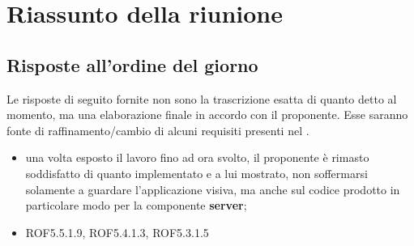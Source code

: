 %


\section{Riassunto della riunione} %
\label{sec:riassunto_della_riunione}

\subsection{Risposte all'ordine del giorno}
Le risposte di seguito fornite non sono la trascrizione esatta di quanto detto al momento, ma una elaborazione finale in accordo con il proponente. \newline
Esse saranno fonte di raffinamento/cambio di alcuni requisiti presenti nel \docNameVersionAdR.

\begin{itemize}
  	\item una volta esposto il lavoro fino ad ora svolto, il proponente è rimasto soddisfatto di quanto implementato e a lui mostrato, non soffermarsi solamente a guardare l'applicazione visiva, ma anche sul codice prodotto in particolare modo per la componente \textbf{server};
	\item ROF5.5.1.9, ROF5.4.1.3, ROF5.3.1.5
\end{itemize}
